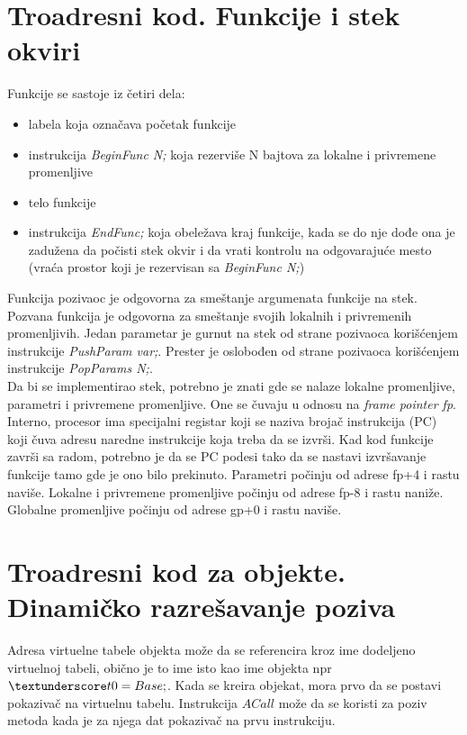 \documentclass[10pt]{extarticle}
\begin{document}
\section{Troadresni kod. Funkcije i stek okviri}
\noindent
Funkcije se sastoje iz četiri dela: 
\begin{itemize}
    \item labela koja označava početak funkcije
    \item instrukcija \textit{BeginFunc N;} koja rezerviše N bajtova za lokalne i privremene promenljive
    \item telo funkcije
    \item instrukcija \textit{EndFunc;} koja obeležava kraj funkcije, kada se do nje dođe ona je zadužena da počisti stek okvir i da vrati kontrolu na odgovarajuće mesto (vraća prostor koji je rezervisan sa \textit{BeginFunc N;})
\end{itemize}
Funkcija pozivaoc je odgovorna za smeštanje argumenata funkcije na stek. Pozvana funkcija je odgovorna za smeštanje svojih lokalnih i privremenih promenljivih.
Jedan parametar je gurnut na stek od strane pozivaoca korišćenjem instrukcije \textit{PushParam var;}. Prester je oslobođen od strane pozivaoca korišćenjem instrukcije \textit{PopParams N;}.\\
Da bi se implementirao stek, potrebno je znati gde se nalaze lokalne promenljive, parametri i privremene promenljive. One se čuvaju u odnosu na \textit{frame pointer fp}. \\
Interno, procesor ima specijalni registar koji se naziva brojač instrukcija (PC) koji čuva adresu naredne instrukcije koja treba da se izvrši. Kad kod funkcije završi sa radom, potrebno je da se PC podesi tako da se nastavi izvršavanje funkcije tamo gde je ono bilo prekinuto. Parametri počinju od adrese fp+4 i rastu naviše. Lokalne i privremene promenljive počinju od adrese fp-8 i rastu naniže.
Globalne promenljive počinju od adrese gp+0 i rastu naviše.

\section{Troadresni kod za objekte. Dinamičko razrešavanje poziva}
\noindent
Adresa virtuelne tabele objekta može da se referencira kroz ime dodeljeno virtuelnoj tabeli, obično je to ime isto kao ime objekta npr $\textunderscore t0 = Base;$. Kada se kreira objekat, mora prvo da se postavi pokazivač na virtuelnu tabelu. Instrukcija $ACall$ može da se koristi za poziv metoda kada je za njega dat pokazivač na prvu instrukciju.
\end{document}
